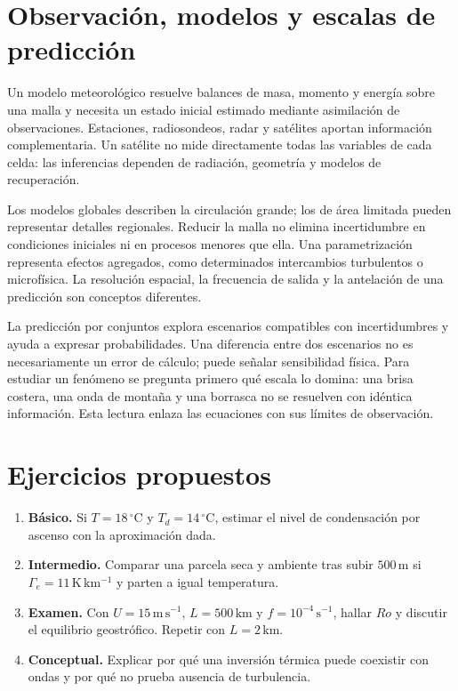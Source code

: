 \section{Observación, modelos y escalas de predicción}
Un modelo meteorológico resuelve balances de masa, momento y energía sobre una malla y necesita un estado inicial estimado mediante asimilación de observaciones. Estaciones, radiosondeos, radar y satélites aportan información complementaria. Un satélite no mide directamente todas las variables de cada celda: las inferencias dependen de radiación, geometría y modelos de recuperación.

Los modelos globales describen la circulación grande; los de área limitada pueden representar detalles regionales. Reducir la malla no elimina incertidumbre en condiciones iniciales ni en procesos menores que ella. Una parametrización representa efectos agregados, como determinados intercambios turbulentos o microfísica. La resolución espacial, la frecuencia de salida y la antelación de una predicción son conceptos diferentes.

La predicción por conjuntos explora escenarios compatibles con incertidumbres y ayuda a expresar probabilidades. Una diferencia entre dos escenarios no es necesariamente un error de cálculo; puede señalar sensibilidad física. Para estudiar un fenómeno se pregunta primero qué escala lo domina: una brisa costera, una onda de montaña y una borrasca no se resuelven con idéntica información. Esta lectura enlaza las ecuaciones con sus límites de observación.

\section{Ejercicios propuestos}
\begin{enumerate}
\item \textbf{Básico.} Si $T=18\,{}^\circ\mathrm{C}$ y $T_d=14\,{}^\circ\mathrm{C}$, estimar el nivel de condensación por ascenso con la aproximación dada.
\item \textbf{Intermedio.} Comparar una parcela seca y ambiente tras subir $500\,\mathrm{m}$ si $\Gamma_e=11\,\mathrm{K\,km^{-1}}$ y parten a igual temperatura.
\item \textbf{Examen.} Con $U=15\,\mathrm{m\,s^{-1}}$, $L=500\,\mathrm{km}$ y $f=10^{-4}\,\mathrm{s^{-1}}$, hallar $Ro$ y discutir el equilibrio geostrófico. Repetir con $L=2\,\mathrm{km}$.
\item \textbf{Conceptual.} Explicar por qué una inversión térmica puede coexistir con ondas y por qué no prueba ausencia de turbulencia.
\end{enumerate}
